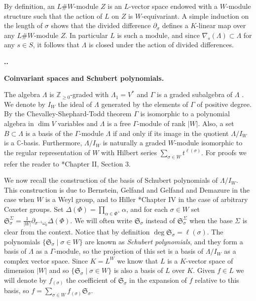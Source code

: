 \documentclass[11pt,fleqn]{amsart}
\renewcommand\thesection{\arabic{section}}
\newcounter{para}[section]
\renewcommand\thepara{\thesection.\arabic{para}}
\def\paragraph{%
 \noindent
 \refstepcounter{para}%
 \textbf{\thepara.}\hspace{1ex}%
}
\newcommand\about[1]{%
 {\bfseries#1.}%
}
\newcommand\CC{\mathbb C}
\newcommand\ZZ{\mathbb Z}
\renewcommand\SS{\mathfrak S}
\begin{document}
By definition, an $L\# W$-module $Z$ is an $L$-vector space 
endowed with a $W$-module structure such that the action of $L$ 
on $Z$ is $W$-equivariant. A simple induction on the length of $\sigma$ shows 
that the divided difference $\partial_\sigma$ defines a $K$-linear map over 
any $L\# W$-module $Z$. In particular $L$ is such a module, and since 
$\nabla_s(\Lambda) \subset \Lambda$ for any $s \in S$, it follows that 
$\Lambda$ is closed under the action of divided differences.

\paragraph
\about{Coinvariant spaces and Schubert polynomials}
The algebra $\Lambda$ is  $\ZZ_{\ge 0}$-graded with $\Lambda_1 = V^*$
and $\Gamma$ is a graded subalgebra of $\Lambda$ . We denote by $I_W$ the 
ideal of $\Lambda$ generated by the elements of $\Gamma$ of positive degree. 
By the Chevalley-Shephard-Todd theorem $\Gamma$ is isomorphic to a polynomial 
algebra in $\dim V$ variables and $\Lambda$ is a free $\Gamma$-module of rank 
$|W|$. Also, a set $B \subset \Lambda$ is a basis of the $\Gamma$-module 
$\Lambda$ if and only if its image in the quotient $\Lambda/I_W$ is a 
$\CC$-basis. Furthermore, $\Lambda/I_W$ is naturally a graded $W$-module 
isomorphic to the regular representation of $W$ with Hilbert series 
$\sum_{\sigma \in W} t^{\ell(\sigma)}$. For proofs we refer the reader to 
\cite{Hiller-coxeter-book}*{Chapter II, Section 3}.

We now recall the construction of the basis of Schubert polynomials of $\Lambda
/I_W$. This construction is due to Bernstein, Gelfand and Gelfand 
\cite{BGG-cohomology} and Demazure \cite{Dem-schubert} in the case when $W$ is 
a Weyl group, and to Hiller \cite{Hiller-coxeter-book}*{Chapter IV} in the 
case of arbitrary Coxeter groups. Set $\Delta(\Phi) = 
\prod_{\alpha \in \Phi^+} \alpha$, and for each 
$\sigma \in W$ set $\SS_\sigma^\Sigma = \frac{1}{|W|} \partial_{\sigma^{-1}
\omega_0} \Delta(\Phi)$. We will often write $\SS_\sigma$ instead of 
$\SS_\sigma^\Sigma$ when the base $\Sigma$ is clear from the context. Notice 
that by definition $\deg \SS_\sigma 
= \ell(\sigma)$. The polynomials $\{\SS_\sigma \mid \sigma \in W\}$ are known
as \emph{Schubert polynomials}, and they form a basis of 
$\Lambda$ as a $\Gamma$-module, so the projection of this set is a basis 
of $\Lambda/I_W$ as a complex vector space. Since $K = L^W$ we know that $L$ 
is a $K$-vector space of dimension $|W|$ and so $\{\SS_\sigma \mid \sigma \in 
W\}$ is also a basis of $L$ over $K$. Given $f \in L$ we will denote by 
$f_{(\sigma)}$ the coefficient of $\SS_\sigma$ in the expansion of $f$ 
relative to this basis, so $f = \sum_{\sigma \in W} f_{(\sigma)} \SS_\sigma$. 
\end{document}
